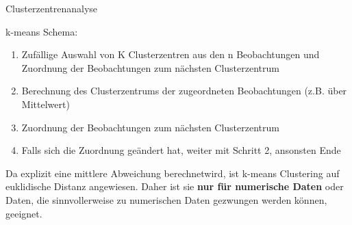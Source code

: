 \documentclass[12pt,ngerman,a4paper,ignorenonframetext,]{beamer}
\providecommand{\tightlist}{%
  \setlength{\itemsep}{0pt}\setlength{\parskip}{0pt}}
\begin{document}
\begin{frame}{Clusterzentrenanalyse}
\protect\hypertarget{clusterzentrenanalyse}{}

k-means Schema:

\begin{enumerate}
\tightlist
\item
  Zufällige Auswahl von K Clusterzentren aus den n Beobachtungen und
  Zuordnung der Beobachtungen zum nächsten Clusterzentrum
\item
  Berechnung des Clusterzentrums der zugeordneten Beobachtungen
  \mbox{(z.\thinspace{}B.}\xspace{} über Mittelwert)
\item
  Zuordnung der Beobachtungen zum nächsten Clusterzentrum
\item
  Falls sich die Zuordnung geändert hat, weiter mit Schritt 2, ansonsten
  Ende
\end{enumerate}

Da explizit eine mittlere Abweichung berechnetwird, ist k-means
Clustering auf euklidische Distanz angewiesen. Daher ist sie \textbf{nur
für numerische Daten} oder Daten, die sinnvollerweise zu numerischen
Daten gezwungen werden können, geeignet.

\end{frame}
\end{document}
